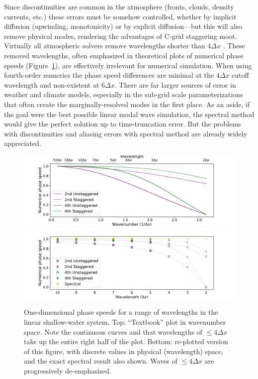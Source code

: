\documentclass[10pt,letterpaper,margin=1in]{memoir}
\begin{document}
Since discontinuities are common in the atmosphere (fronts, clouds, density currents, etc.) these errors must be somehow controlled, whether by implicit diffusion (upwinding, monotonicity) or by explicit diffusion---but this will also remove physical modes, rendering the advantages of C-grid staggering moot. Virtually all atmospheric solvers remove wavelengths shorter than $4\Delta x$ \citep{Jablonowski2011}. These removed wavelengths, often emphasized in theoretical plots of numerical phase speeds (Figure~\ref{fig:phasespeedgoodbad}), are effectively irrelevant for numerical simulation. When using fourth-order numerics the phase speed differences are minimal at the $4\Delta x$ cutoff wavelength and non-existent at $6\Delta x$. There are far larger sources of error in weather and climate models, especially in the sub-grid scale parameterizations that often create the marginally-resolved modes in the first place. As an aside, if the goal were the best possible linear modal wave simulation, the spectral method would give the perfect solution up to time-truncation error. But the problems with discontinuities and aliasing errors with spectral method are already widely appreciated.

\begin{figure}[htbp]
   \centering
   \includegraphics[scale=0.4]{phasespeedbad.pdf} %
   \includegraphics[scale=0.4]{phasespeedgood.pdf} %
   \caption{One-dimensional phase speeds for a range of wavelengths in the linear shallow-water system. Top: ``Textbook'' plot in wavenumber space. Note the continuous curves and that wavelengths of $\le 4\Delta x$ take up the entire right half of the plot. Bottom: re-plotted version of this figure, with discrete values in physical (wavelength) space, and the exact spectral result also shown. Waves of  $\le 4\Delta x$ are progressively de-emphasized.}
   \label{fig:phasespeedgoodbad}
\end{figure}
\end{document}
